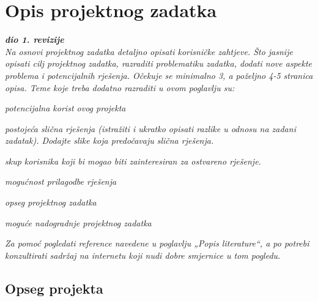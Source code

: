 \chapter{Opis projektnog zadatka}
		
		\textbf{\textit{dio 1. revizije}}\\
		
		\textit{Na osnovi projektnog zadatka detaljno opisati korisničke zahtjeve. Što jasnije opisati cilj projektnog zadatka, razraditi problematiku zadatka, dodati nove aspekte problema i potencijalnih rješenja. Očekuje se minimalno 3, a poželjno 4-5 stranica opisa.	Teme koje treba dodatno razraditi u ovom poglavlju su:}
		\begin{packed_item}
			\item \textit{potencijalna korist ovog projekta}
			\item \textit{postojeća slična rješenja (istražiti i ukratko opisati razlike u odnosu na zadani zadatak). Dodajte slike koja predočavaju slična rješenja.}
			\item \textit{skup korisnika koji bi mogao biti zainteresiran za ostvareno rješenje.}
			\item \textit{mogućnost prilagodbe rješenja }
			\item \textit{opseg projektnog zadatka}
			\item \textit{moguće nadogradnje projektnog zadatka}
		\end{packed_item}
		
		\textit{Za pomoć pogledati reference navedene u poglavlju „Popis literature“, a po potrebi konzultirati sadržaj na internetu koji nudi dobre smjernice u tom pogledu.}
		\eject
		
		\section{Opseg projekta}
		
